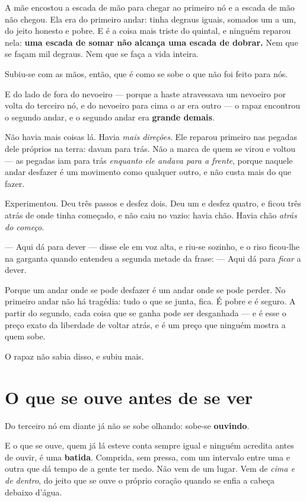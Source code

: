 \documentclass[livro.tex]{subfiles}
\begin{document}
A mãe encostou a escada de mão para chegar ao primeiro nó e a escada de mão não chegou.
Ela era do primeiro andar: tinha degraus iguais, somados um a um, do jeito honesto e
pobre. E é a coisa mais triste do quintal, e ninguém reparou nela: \textbf{uma escada de
somar não alcança uma escada de dobrar.} Nem que se façam mil degraus. Nem que se faça a
vida inteira.

\medskip

Subiu-se com as mãos, então, que é como se sobe o que não foi feito para nós.

E do lado de fora do nevoeiro --- porque a haste atravessava um nevoeiro por volta do
terceiro nó, e do nevoeiro para cima o ar era outro --- o rapaz encontrou o segundo andar,
e o segundo andar era \textbf{grande demais}.

Não havia mais coisas lá. Havia \emph{mais direções}. Ele reparou primeiro nas pegadas
dele próprios na terra: davam para trás. Não a marca de quem se virou e voltou --- as
pegadas iam para trás \emph{enquanto ele andava para a frente}, porque naquele andar
desfazer é um movimento como qualquer outro, e não custa mais do que fazer.

Experimentou. Deu três passos e desfez dois. Deu um e desfez quatro, e ficou três atrás de
onde tinha começado, e não caiu no vazio: havia chão. Havia chão \emph{atrás do começo}.

--- Aqui dá para dever --- disse ele em voz alta, e riu-se sozinho, e o riso ficou-lhe na
garganta quando entendeu a segunda metade da frase: --- Aqui dá para \emph{ficar} a dever.

\medskip

Porque um andar onde se pode desfazer é um andar onde se pode perder. No primeiro andar
não há tragédia: tudo o que se junta, fica. É pobre e é seguro. A partir do segundo, cada
coisa que se ganha pode ser desganhada --- e é esse o preço exato da liberdade de voltar
atrás, e é um preço que ninguém mostra a quem sobe.

O rapaz não sabia disso, e subiu mais.

\section{O que se ouve antes de se ver}

Do terceiro nó em diante já não se sobe olhando: sobe-se \textbf{ouvindo}.

E o que se ouve, quem já lá esteve conta sempre igual e ninguém acredita antes de ouvir,
é uma \textbf{batida}. Comprida, sem pressa, com um intervalo entre uma e outra que dá
tempo de a gente ter medo. Não vem de um lugar. Vem de \emph{cima e de dentro}, do jeito
que se ouve o próprio coração quando se enfia a cabeça debaixo d'água.
\end{document}
